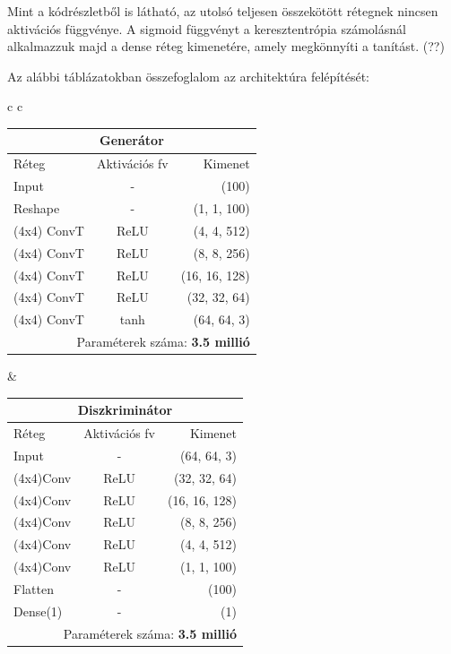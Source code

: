 Mint a kódrészletből is látható, az utolsó teljesen összekötött rétegnek nincsen aktivációs függvénye. A sigmoid függvényt a keresztentrópia számolásnál alkalmazzuk majd a dense réteg kimenetére, amely megkönnyíti a tanítást. (??)

Az alábbi táblázatokban összefoglalom az architektúra felépítését:
\begin{center}

\begin{tabular}{c c}

\scriptsize{
\begin{tabular}{@{\extracolsep{5pt}} |l c r| }
	\hline
	\multicolumn{3}{|c|}{\textbf{Generátor}} \\
	\hline
	Réteg & Aktivációs fv & Kimenet\\
	\cline{1-1} \cline{2-2} \cline{3-3}
	Input & - & (100)\\
	Reshape & - & (1, 1, 100)\\
	(4x4) ConvT & ReLU & (4, 4, 512)\\
	(4x4) ConvT & ReLU & (8, 8, 256)\\
	(4x4) ConvT & ReLU & (16, 16, 128)\\
	(4x4) ConvT & ReLU & (32, 32, 64)\\
	(4x4) ConvT & tanh & (64, 64, 3)\\
	\hline
	\multicolumn{3}{|r|}{Paraméterek száma: \textbf{3.5 millió}} \\
	\hline
\end{tabular}}

&\scriptsize{
\begin{tabular}{@{\extracolsep{5pt}} |l c r| }
	\hline
	\multicolumn{3}{|c|}{\textbf{Diszkriminátor}} \\
	\hline
	Réteg & Aktivációs fv & Kimenet\\
	\cline{1-1} \cline{2-2} \cline{3-3}
	Input & - & (64, 64, 3)\\
	(4x4)Conv & ReLU & (32, 32, 64)\\
	(4x4)Conv & ReLU & (16, 16, 128)\\
	(4x4)Conv & ReLU & (8, 8, 256)\\
	(4x4)Conv & ReLU & (4, 4, 512)\\
	(4x4)Conv & ReLU & (1, 1, 100)\\
	Flatten & - & (100)\\
	Dense(1) & - & (1)\\
	\hline
	\multicolumn{3}{|r|}{Paraméterek száma: \textbf{3.5 millió}} \\
	\hline
\end{tabular}}

\end{tabular}
\end{center}

